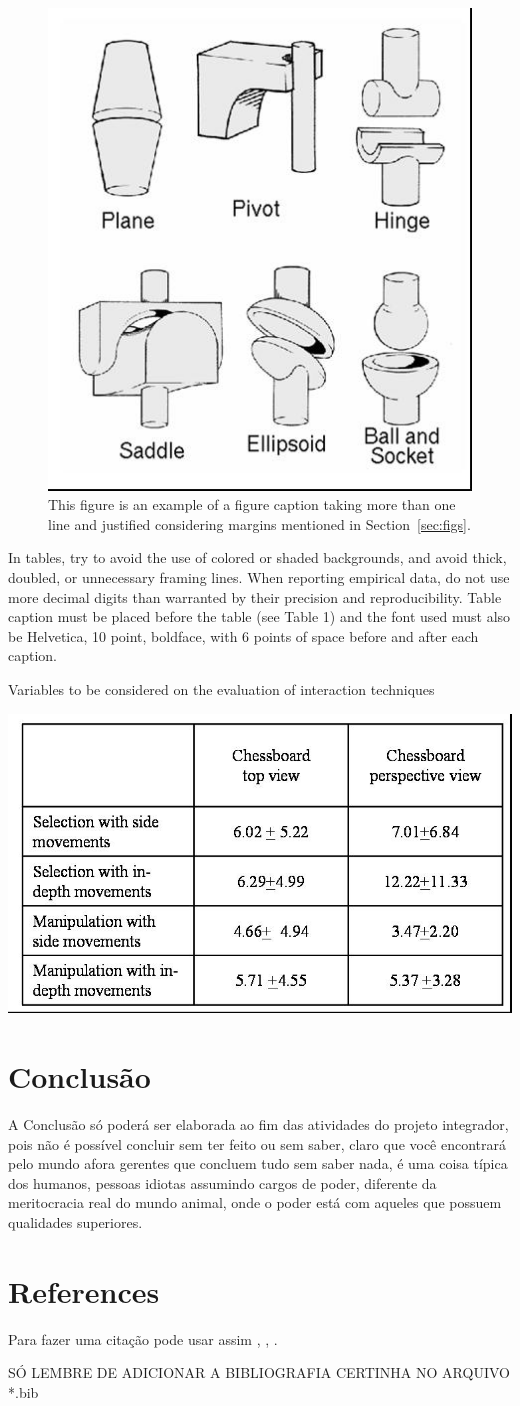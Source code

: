 \documentclass[12pt]{article}
\begin{document}
\begin{figure}[ht]
\centering
\includegraphics[width=.3\textwidth]{fig2.jpg}
\caption{This figure is an example of a figure caption taking more than one
  line and justified considering margins mentioned in Section~\ref{sec:figs}.}
\label{fig:exampleFig2}
\end{figure}

In tables, try to avoid the use of colored or shaded backgrounds, and avoid
thick, doubled, or unnecessary framing lines. When reporting empirical data,
do not use more decimal digits than warranted by their precision and
reproducibility. Table caption must be placed before the table (see Table 1)
and the font used must also be Helvetica, 10 point, boldface, with 6 points of
space before and after each caption.

\begin{table}[ht]
\centering
\caption{Variables to be considered on the evaluation of interaction
  techniques}
\label{tab:exTable1}
\includegraphics[width=.7\textwidth]{table.jpg}
\end{table}

\section{Conclusão}

A Conclusão só poderá ser elaborada ao fim das atividades do projeto integrador, pois não é possível concluir sem ter feito ou sem saber, claro que você encontrará pelo mundo afora gerentes que concluem tudo sem saber nada, é uma coisa típica dos humanos, pessoas idiotas assumindo cargos de poder, diferente da meritocracia real do mundo animal, onde o poder está com aqueles que possuem qualidades superiores.

\section{References}

Para fazer uma citação pode usar assim \cite{barbosa:97},
\cite{rau:11}, \cite{barbosa:97}.

SÓ LEMBRE DE ADICIONAR A BIBLIOGRAFIA CERTINHA NO ARQUIVO *.bib



\end{document}

